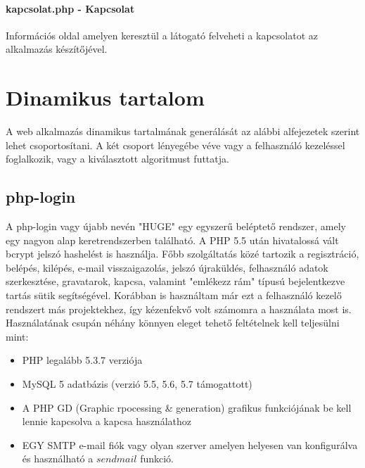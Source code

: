 \documentclass[12pt]{report}
\theoremstyle{definition}
\begin{document}
	\paragraph{kapcsolat.php - Kapcsolat} Információs oldal amelyen keresztül a látogató felveheti a kapcsolatot az alkalmazás készítőjével.
	
	\section{Dinamikus tartalom}
	
	A web alkalmazás dinamikus tartalmának generálását az alábbi alfejezetek szerint lehet csoportosítani. A két csoport lényegébe véve vagy a felhasználó kezeléssel foglalkozik, vagy a kiválasztott algoritmust futtatja.
	
	\subsection{php-login}
	A php-login \cite{php-login} vagy újabb nevén "HUGE" egy egyszerű beléptető rendszer, amely egy nagyon alap keretrendszerben található. A PHP 5.5 után hivatalossá vált bcrypt jelszó hashelést is használja. Főbb szolgáltatás közé tartozik a regisztráció, belépés, kilépés, e-mail visszaigazolás, jelszó újraküldés, felhasználó adatok szerkesztése, gravatarok, kapcsa, valamint "emlékezz rám" típusú bejelentkezve tartás sütik segítségével. Korábban is használtam már ezt a felhasználó kezelő rendszert más projektekhez, így kézenfekvő volt számomra a használata most is. Használatának csupán néhány könnyen eleget tehető feltételnek kell teljesülni mint:
	
	\begin{itemize}
		\item PHP legalább 5.3.7 verziója
		\item MySQL 5 adatbázis (verzió 5.5, 5.6, 5.7 támogattott) 
		\item A PHP GD (Graphic rpocessing \& generation) grafikus funkciójának be kell lennie kapcsolva a kapcsa használathoz
		\item EGY SMTP e-mail fiók vagy olyan szerver amelyen helyesen van konfigurálva és használható a $sendmail$ funkció.
	\end{itemize}
	
\end{document}
